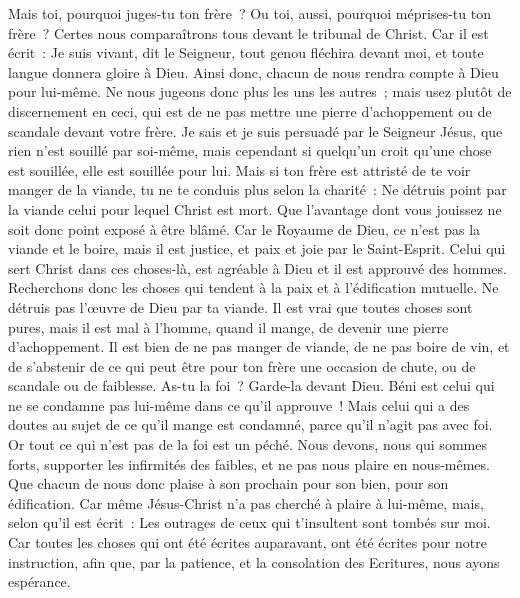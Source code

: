\begin{multicols}{2}
Mais toi, pourquoi juges-tu ton frère~? Ou toi, aussi, pourquoi méprises-tu ton frère~? Certes nous comparaîtrons tous devant le tribunal de Christ.
Car il est écrit~: Je suis vivant, dit le Seigneur, tout genou fléchira devant moi, et toute langue donnera gloire à Dieu.
 Ainsi donc, chacun de nous rendra compte à Dieu pour lui-même.
Ne nous jugeons donc plus les uns les autres~; mais usez plutôt de discernement en ceci, qui est de ne pas mettre une pierre d'achoppement ou de scandale devant votre frère.
Je sais et je suis persuadé par le Seigneur Jésus, que rien n'est souillé par soi-même, mais cependant si quelqu'un croit qu'une chose est souillée, elle est souillée pour lui.
Mais si ton frère est attristé de te voir manger de la viande, tu ne te conduis plus selon la charité~: Ne détruis point par la viande celui pour lequel Christ est mort.
Que l'avantage dont vous jouissez ne soit donc point exposé à être blâmé.
Car le Royaume de Dieu, ce n'est pas la viande et le boire, mais il est justice, et paix et joie par le Saint-Esprit.
Celui qui sert Christ dans ces choses-là, est agréable à Dieu et il est approuvé des hommes.
Recherchons donc les choses qui tendent à la paix et à l'édification mutuelle.
Ne détruis pas l'œuvre de Dieu par ta viande. Il est vrai que toutes choses sont pures, mais il est mal à l'homme, quand il mange, de devenir une pierre d'achoppement.
Il est bien de ne pas manger de viande, de ne pas boire de vin, et de s'abstenir de ce qui peut être pour ton frère une occasion de chute, ou de scandale ou de faiblesse.
As-tu la foi~? Garde-la devant Dieu. Béni est celui qui ne se condamne pas lui-même dans ce qu'il approuve~!
Mais celui qui a des doutes au sujet de ce qu'il mange est condamné, parce qu'il n'agit pas avec foi. Or tout ce qui n'est pas de la foi est un péché.
\VerseOne{}Nous devons, nous qui sommes forts, supporter les infirmités des faibles, et ne pas nous plaire en nous-mêmes.
Que chacun de nous donc plaise à son prochain pour son bien, pour son édification.
Car même Jésus-Christ n'a pas cherché à plaire à lui-même, mais, selon qu'il est écrit~: Les outrages de ceux qui t'insultent sont tombés sur moi.
Car toutes les choses qui ont été écrites auparavant, ont été écrites pour notre instruction, afin que, par la patience, et la consolation des Ecritures, nous ayons espérance.

\end{multicols}
